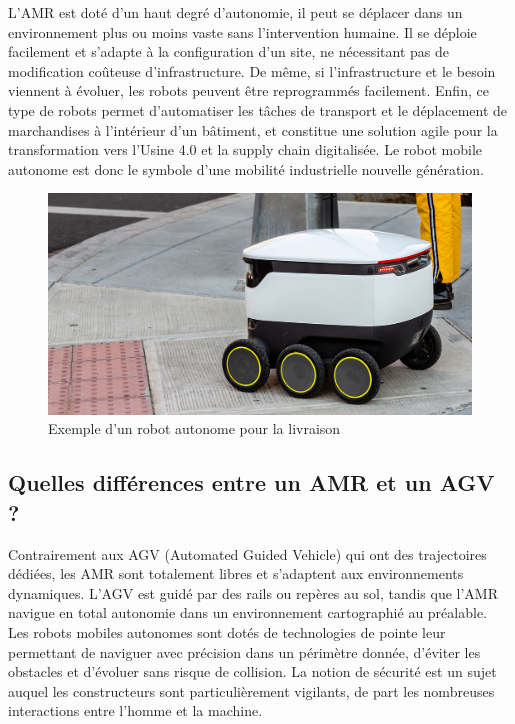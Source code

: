 L’AMR est doté d’un haut degré d’autonomie, il peut se déplacer dans un environnement plus ou moins vaste sans l’intervention humaine. Il se déploie facilement et s’adapte à la configuration d’un site, ne nécessitant pas de modification coûteuse d’infrastructure. De même, si l’infrastructure et le besoin viennent à évoluer, les robots peuvent être reprogrammés facilement. Enfin, ce type de robots permet d’automatiser les tâches de transport et le déplacement de marchandises à l’intérieur d’un bâtiment, et constitue une solution agile pour la transformation vers l’Usine 4.0 et la supply chain digitalisée. Le robot mobile autonome est donc le symbole d’une mobilité industrielle nouvelle génération.
\begin{figure}[h]
    \centering
    \includegraphics[width=14cm]{assets/Robot_AMR.jpg}
    \caption{Exemple d'un robot autonome pour la livraison \cite{italianingenioMobiliteIndustrieRobots2021}}
    \label{amr}
    \end{figure}
\subsection{Quelles différences entre un AMR et un AGV ?
}
Contrairement aux AGV (Automated Guided Vehicle) qui ont des trajectoires dédiées, les AMR sont totalement libres et s’adaptent aux environnements dynamiques. L’AGV est guidé par des rails ou repères au sol, tandis que l’AMR navigue en total autonomie dans un environnement cartographié au préalable. Les robots mobiles autonomes sont dotés de technologies de pointe leur permettant de naviguer avec précision dans un périmètre donnée, d’éviter les obstacles et d’évoluer sans risque de collision. La notion de sécurité est un sujet auquel les constructeurs sont particulièrement vigilants, de part les nombreuses interactions entre l’homme et la machine.
